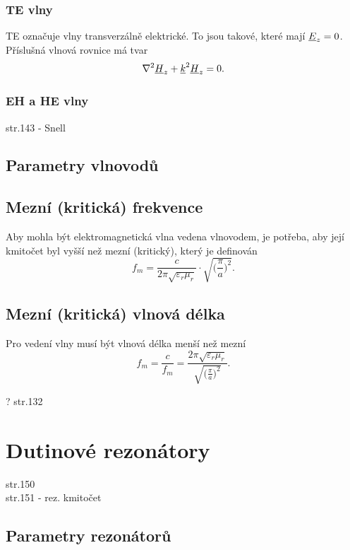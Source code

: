 \subsubsection*{TE vlny}
TE označuje vlny transverzálně elektrické. To jsou takové, které mají ${\underline{E}}_{z} = 0$. Příslušná vlnová rovnice má tvar
\begin{displaymath}
	\nabla^{2} {\underline{H}}_{z} + {\underline{k}}^{2}{\underline{H}}_{z} = 0.
\end{displaymath} 

\subsubsection*{EH a HE vlny}
str.143 - Snell\\

\subsection{Parametry vlnovodů}

\subsection*{Mezní (kritická) frekvence}
Aby mohla být elektromagnetická vlna vedena vlnovodem, je potřeba, aby její kmitočet byl vyšší než mezní (kritický), který je definován
\begin{equation}
f_{m} = \frac{c}{2\pi\sqrt{\varepsilon_{r}\mu_{r}}}\cdot\sqrt{\bigg(\frac{\pi}{a}\bigg)^{2}}. 
	\label{rce:evlny_vlnovody_mezni_frekvence}
\end{equation}
\subsection*{Mezní (kritická) vlnová délka}
Pro vedení vlny musí být vlnová délka menší než mezní
\begin{equation}
f_{m} = \frac{c}{f_{m}} = \frac{2\pi\sqrt{\varepsilon_{r}\mu_{r}}}{\sqrt{\big(\frac{\pi}{a}\big)^{2}}}. 
	\label{rce:evlny_vlnovody_mezni_vlnova_delka}
\end{equation}


? str.132

\newpage


\section{Dutinové rezonátory}
str.150\\
str.151 - rez. kmitočet\\
\subsection{Parametry rezonátorů}

\newpage